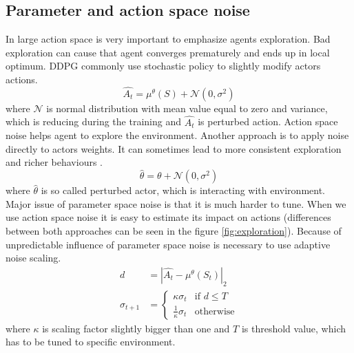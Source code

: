 \subsection{Parameter and action space noise}
In large action space is very important to emphasize agents exploration. Bad exploration can cause that agent converges prematurely and ends up in local optimum. DDPG commonly use stochastic policy to slightly modify actors actions.
\begin{equation} \label{eq:exploration}
\hat{A_t} = \mu^\theta(S) + \mathcal{N}(0, \sigma^2)
\end{equation}
where $\mathcal{N}$ is normal distribution with mean value equal to zero and variance, which is reducing during the training and $\hat{A_t}$ is perturbed action. Action space noise helps agent to explore the environment. Another approach is to apply noise directly to actors weights. It can sometimes lead to more consistent exploration and richer behaviours \cite{plappert2017}.
\begin{equation}
\hat{\theta} = \theta + \mathcal{N}(0, \sigma^2)
\end{equation}
where $\hat{\theta}$ is so called perturbed actor, which is interacting with environment. 
\pagebreak
Major issue of parameter space noise is that it is much harder to tune. When we use action space noise it is easy to estimate its impact on actions (differences between both approaches can be seen in the figure \ref{fig:exploration}). Because of unpredictable influence of parameter space noise is necessary to use adaptive noise scaling.
\begin{align}
d &= |\hat{A_t} - \mu^\theta(S_t)|_2  \\
\sigma_{t+1} &= 
     \begin{cases}
       \kappa \sigma_t & \text{if } d \leq T \\
       \frac{1}{\kappa}\sigma_t & \text{otherwise}
     \end{cases}
\end{align}
where $\kappa$ is scaling factor slightly bigger than one and $T$ is threshold value, which has to be tuned to specific environment.

